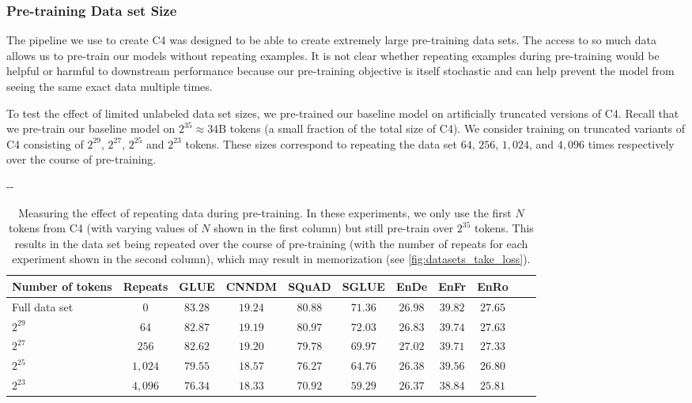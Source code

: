 \documentclass[twoside,11pt]{article}
\newlength{\offsetpage}
\newenvironment{widepage}{\begin{adjustwidth}{-\offsetpage}{-\offsetpage}
    \addtolength{\textwidth}{2\offsetpage}}
{\end{adjustwidth}}
\newcommand{\bsl}{\makebox[0pt][r]{\raisebox{0.05em}{$\bigstar\,$}}}
\def\*#1{\mathbf{#1}}
\begin{document}
\subsubsection{Pre-training Data set Size}
\label{sec:datasets_take}

The pipeline we use to create C4 was designed to be able to create extremely large pre-training data sets.
The access to so much data allows us to pre-train our models without repeating examples.
It is not clear whether repeating examples during pre-training would be helpful or harmful to downstream performance because our pre-training objective is itself stochastic and can help prevent the model from seeing the same exact data multiple times.

To test the effect of limited unlabeled data set sizes, we pre-trained our baseline model on artificially truncated versions of C4.
Recall that we pre-train our baseline model on $2^{35} \approx 34\mathrm{B}$ tokens (a small fraction of the total size of C4).
We consider training on truncated variants of C4 consisting of $2^{29}$, $2^{27}$, $2^{25}$ and $2^{23}$ tokens.
These sizes correspond to repeating the data set $64$, $256$, $1{,}024$, and $4{,}096$ times respectively over the course of pre-training.

\begin{table}
\footnotesize
\begin{widepage}
\centering
\begin{tabular}{l c c c c c c c c c c}
\toprule
    Number of tokens   & Repeats   & GLUE        & CNNDM       & SQuAD       & SGLUE       & EnDe        & EnFr        & EnRo    \\
\midrule
    \bsl Full data set  & $0$       & $\*{83.28}$ & $\*{19.24}$ & $\*{80.88}$ & $\*{71.36}$ & $\*{26.98}$ & $\*{39.82}$ & $\*{27.65}$ \\
    $2^{29}$           & $64$      & $\*{82.87}$ & $\*{19.19}$ & $\*{80.97}$ & $\*{72.03}$ & $\*{26.83}$ & $\*{39.74}$ & $\*{27.63}$ \\
    $2^{27}$           & $256$     & $82.62$     & $\*{19.20}$ & $79.78$     & $69.97$     & $\*{27.02}$ & $\*{39.71}$ & $27.33$ \\
    $2^{25}$           & $1{,}024$ & $79.55$     & $18.57$     & $76.27$     & $64.76$     & $26.38$     & $39.56$     & $26.80$ \\
    $2^{23}$           & $4{,}096$ & $76.34$     & $18.33$     & $70.92$     & $59.29$     & $26.37$     & $38.84$     & $25.81$ \\
\bottomrule
\end{tabular}
\end{widepage}
\caption{
Measuring the effect of repeating data during pre-training.
In these experiments, we only use the first $N$ tokens from C4 (with varying values of $N$ shown in the first column) but still pre-train over $2^{35}$ tokens.
This results in the data set being repeated over the course of pre-training (with the number of repeats for each experiment shown in the second column), which may result in memorization (see \cref{fig:datasets_take_loss}).
}
\label{tab:datasets_take}
\end{table}
\end{document}
